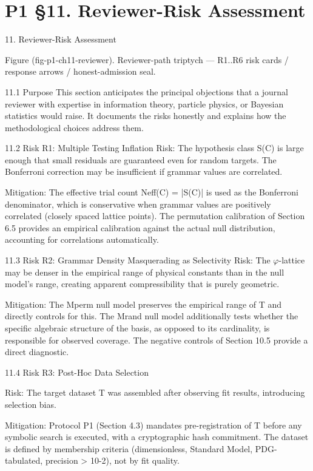 
\section{P1 §11. Reviewer-Risk Assessment}

11. Reviewer-Risk Assessment

      Figure (fig-p1-ch11-reviewer). Reviewer-path triptych --- R1..R6 risk cards / response arrows /
                                         honest-admission seal.

  11.1 Purpose
  This section anticipates the principal objections that a journal reviewer with expertise
  in information theory, particle physics, or Bayesian statistics would raise. It documents
  the risks honestly and explains how the methodological choices address them.

  11.2 Risk R1: Multiple Testing Inflation
  Risk: The hypothesis class S(C) is large enough that small residuals are guaranteed
  even for random targets. The Bonferroni correction may be insufficient if grammar
  values are correlated.

  Mitigation: The effective trial count Neff(C) = |S(C)| is used as the Bonferroni
  denominator, which is conservative when grammar values are positively correlated
  (closely spaced lattice points). The permutation calibration of Section 6.5 provides an
  empirical calibration against the actual null distribution, accounting for correlations
  automatically.

  11.3 Risk R2: Grammar Density Masquerading as Selectivity
  Risk: The $\varphi$-lattice may be denser in the empirical range of physical constants than in
  the null model's range, creating apparent compressibility that is purely geometric.

  Mitigation: The Mperm null model preserves the empirical range of T and directly
  controls for this. The Mrand null model additionally tests whether the specific algebraic
  structure of the basis, as opposed to its cardinality, is responsible for observed
  coverage. The negative controls of Section 10.5 provide a direct diagnostic.

  11.4 Risk R3: Post-Hoc Data Selection

  Risk: The target dataset T was assembled after observing fit results, introducing
  selection bias.

  Mitigation: Protocol P1 (Section 4.3) mandates pre-registration of T before any
  symbolic search is executed, with a cryptographic hash commitment. The dataset is
  defined by membership criteria (dimensionless, Standard Model, PDG-tabulated,
  precision > 10-2), not by fit quality.

